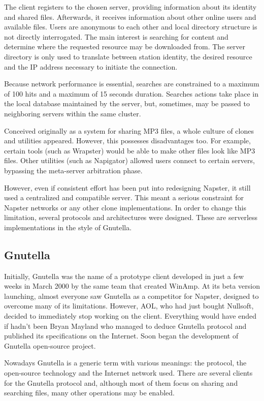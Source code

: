 The client registers to the chosen server, providing information about its
identity and shared files. Afterwards, it receives information about other
online users and available files. Users are anonymous to each other and local
directory structure is not directly interrogated. The main interest is
searching for content and determine where the requested resource may be
downloaded from.  The server directory is only used to translate between
station identity, the desired resource and the IP address necessary to
initiate the connection.

Because network performance is essential, searches are constrained to a maximum
of 100 hits and a maximum of 15 seconds duration. Searches actions take place
in the local database maintained by the server, but, sometimes, may be passed
to neighboring servers within the same cluster.

Conceived originally as a system for sharing MP3 files, a whole culture of
clones and utilities appeared. However, this possesses disadvantages too. For
example, certain tools (such as Wrapster) would be able to make other files
look like MP3 files. Other utilities (such as Napigator) allowed users
connect to certain servers, bypassing the meta-server arbitration phase.

However, even if consistent effort has been put into redesigning Napster, it
still used a centralized and compatible server. This meant a serious
constraint for Napster networks or any other clone implementations. In order
to change this limitation, several protocols and architectures were designed.
These are serverless implementations in the style of Gnutella.

\subsection{Gnutella}

Initially, Gnutella was the name of a prototype client developed in just a few
weeks in March 2000 by the same team that created WinAmp. At its beta version
launching, almost everyone saw Gnutella as a competitor for Napster, designed
to overcome many of its limitations. However, AOL, who had just bought
Nullsoft, decided to immediately stop working on the client. Everything would
have ended if hadn't been Bryan Mayland who managed to deduce Gnutella
protocol and published its specifications on the Internet. Soon began the
development of Gnutella open-source project.

Nowadays Gnutella is a generic term with various meanings: the protocol, the
open-source technology and the Internet network used. There are several
clients for the Gnutella protocol and, although most of them focus on sharing
and searching files, many other operations may be enabled.

